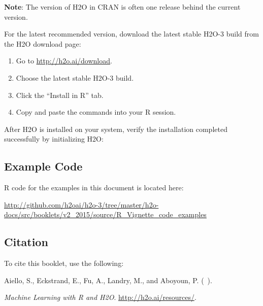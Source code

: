 {{\bf{Note}}: The version of H2O in CRAN is often one release behind the current version.

For the latest recommended version, download the
latest stable H2O-3 build from the H2O download page:

\begin{enumerate}
\item Go to {\url{http://h2o.ai/download}}.
\item Choose the latest stable H2O-3 build.
\item Click the ``Install in R'' tab.
\item Copy and paste the commands into your R session.
\end{enumerate}


After H2O is installed on your system, verify the installation completed successfully by initializing H2O:

\waterExampleInR
\medskip


\subsection{Example Code}

R code for the examples in this document is located here:

\url{http://github.com/h2oai/h2o-3/tree/master/h2o-docs/src/booklets/v2_2015/source/R_Vignette_code_examples}

\subsection{Citation}

To cite this booklet, use the following: 

Aiello, S., Eckstrand, E., Fu, A., Landry, M., and Aboyoun, P. (\shortmonthname\ \the\year). {\textit{Machine Learning with R and H2O}. {\url{http://h2o.ai/resources/}}.



}}
